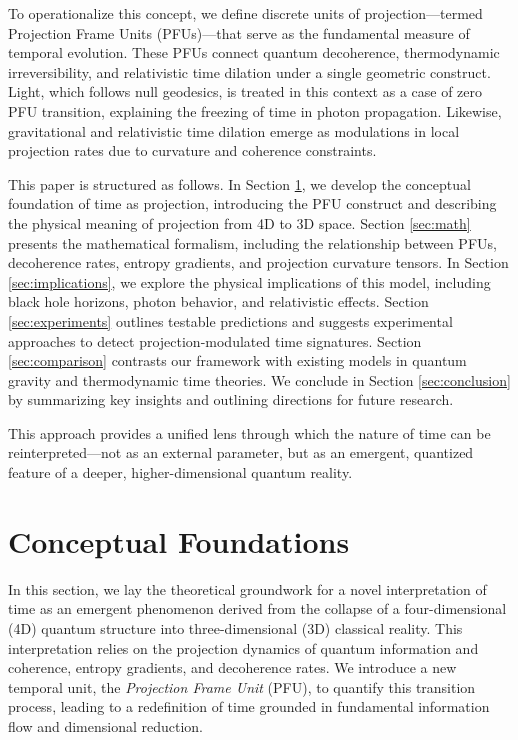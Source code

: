 \documentclass[12pt,a4paper]{article}
\numberwithin{equation}{section}
\begin{document}
To operationalize this concept, we define discrete units of projection—termed Projection Frame Units (PFUs)—that serve as the fundamental measure of temporal evolution. These PFUs connect quantum decoherence, thermodynamic irreversibility, and relativistic time dilation under a single geometric construct. Light, which follows null geodesics, is treated in this context as a case of zero PFU transition, explaining the freezing of time in photon propagation. Likewise, gravitational and relativistic time dilation emerge as modulations in local projection rates due to curvature and coherence constraints.

This paper is structured as follows. In Section \ref{sec:foundations}, we develop the conceptual foundation of time as projection, introducing the PFU construct and describing the physical meaning of projection from 4D to 3D space. Section \ref{sec:math} presents the mathematical formalism, including the relationship between PFUs, decoherence rates, entropy gradients, and projection curvature tensors. In Section \ref{sec:implications}, we explore the physical implications of this model, including black hole horizons, photon behavior, and relativistic effects. Section \ref{sec:experiments} outlines testable predictions and suggests experimental approaches to detect projection-modulated time signatures. Section \ref{sec:comparison} contrasts our framework with existing models in quantum gravity and thermodynamic time theories. We conclude in Section \ref{sec:conclusion} by summarizing key insights and outlining directions for future research.

This approach provides a unified lens through which the nature of time can be reinterpreted—not as an external parameter, but as an emergent, quantized feature of a deeper, higher-dimensional quantum reality.


\section{Conceptual Foundations}
\label{sec:foundations}

In this section, we lay the theoretical groundwork for a novel interpretation of time as an emergent phenomenon derived from the collapse of a four-dimensional (4D) quantum structure into three-dimensional (3D) classical reality. This interpretation relies on the projection dynamics of quantum information and coherence, entropy gradients, and decoherence rates. We introduce a new temporal unit, the \emph{Projection Frame Unit} (PFU), to quantify this transition process, leading to a redefinition of time grounded in fundamental information flow and dimensional reduction.
\end{document}
